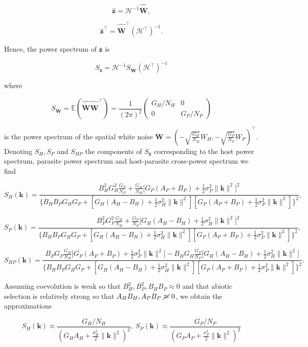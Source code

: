 \documentclass{article}
\begin{document}
\[\hat{\pmb z}=\mathscr H^{-1}\widehat{\dot{\pmb W}},\]

\[\hat{\pmb z}^\top=\widehat{\dot{\pmb W}}^\top\left(\mathscr H^\top\right)^{-1}.\]

Hence, the power spectrum of \(\bar{\pmb z}\) is

\[S_{\bar{\pmb z}}=\mathscr H^{-1}S_{\dot{\pmb W}}\left(\mathscr H^\top\right)^{-1}\]

where

\[S_{\dot{\pmb W}}=\mathbb E\left(\widehat{\dot{\pmb W}}\widehat{\dot{\pmb W}}^\top\right)=\frac{1}{(2\pi)^2}\left(\begin{matrix}G_H/N_H & 0 \\ 0 & G_P/N_P \end{matrix}\right)\]

is the power spectrum of the spatial white noise
\(\dot{\pmb W}=\left(-\sqrt{\tfrac{G_H}{N_H}}{\dot W}_H, -\sqrt{\tfrac{G_P}{N_P}}{\dot W}_P\right)^\top\).
Denoting \(S_H,S_P\) and \(S_{HP}\) the components of
\(S_{\bar{\pmb z}}\) corresponding to the host power spectrum, parasite
power spectrum and host-parasite cross-power spectrum we find

\[S_H(\pmb k)=\frac{B_H^2G_H^2\frac{G_P}{N_P}+\frac{G_H}{N_H}\big[G_P(A_P+B_P)+\frac{1}{2}\sigma_P^2\|\pmb k\|^2\big]^2}{\big\{B_HB_PG_HG_P+[G_H(A_H-B_H)+\frac{1}{2}\sigma_H^2\|\pmb k\|^2][G_P(A_P+B_P)+\frac{1}{2}\sigma_P^2\|\pmb k\|^2]\big\}^2},\]

\[S_P(\pmb k)=\frac{B_P^2G_P^2\frac{G_H}{N_H}+\frac{G_P}{N_P}\big[G_H(A_H-B_H)+\frac{1}{2}\sigma_H^2\|\pmb k\|^2\big]^2}{\big\{B_HB_PG_HG_P+[G_H(A_H-B_H)+\frac{1}{2}\sigma_H^2\|\pmb k\|^2][G_P(A_P+B_P)+\frac{1}{2}\sigma_P^2\|\pmb k\|^2]\big\}^2},\]

\[S_{HP}(\pmb k)=\frac{B_PG_P\frac{G_H}{N_H}\big[G_P(A_P+B_P)+\frac{1}{2}\sigma_P^2\|\pmb k\|^2\big]-B_HG_H\frac{G_P}{N_P}\big[G_H(A_H-B_H)+\frac{1}{2}\sigma_H^2\|\pmb k\|^2\big]}{\big\{B_HB_PG_HG_P+[G_H(A_H-B_H)+\frac{1}{2}\sigma_H^2\|\pmb k\|^2][G_P(A_P+B_P)+\frac{1}{2}\sigma_P^2\|\pmb k\|^2]\big\}^2}.\]

Assuming coevolution is weak so that \(B_H^2,B_P^2,B_HB_P\approx0\) and
that abiotic selection is relatively strong so that
\(A_HB_H,A_PB_P \ \cancel{\approx} \ 0\), we obtain the approximations

\[S_H(\pmb k)\approx\frac{G_H/N_H}{\left(G_HA_H+\frac{\sigma_H^2}{2}\|\pmb k\|^2\right)^2}, \ S_P(\pmb k)\approx\frac{G_P/N_P}{\left(G_PA_P+\frac{\sigma_P^2}{2}\|\pmb k\|^2\right)^2}\]
\end{document}
